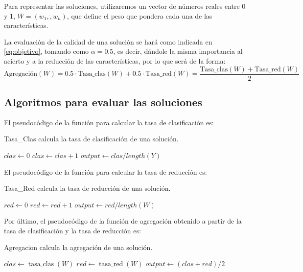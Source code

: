 \documentclass[11pt,a4paper]{article}
\begin{document}
Para representar las soluciones, utilizaremos un vector de números reales entre 0 y 1, $W = (w_{1}, \dot, w_{n})$, que define el peso que pondera cada una de las características.

La evaluación de la calidad de una solución se hará como indicada en \eqref{eq:objetivo}, tomando como $\alpha = 0.5$, es decir, dándole la misma importancia al acierto y a la reducción de las características, por lo que será de la forma:
$$\text{Agregación}(W) = 0.5 \cdot \text{Tasa\_clas}(W) + 0.5 \cdot \text{Tasa\_red}(W) = \frac{\text{Tasa\_clas}(W) + \text{Tasa\_red}(W)}{2}$$

\subsection{Algoritmos para evaluar las soluciones}

El pseudocódigo de la función para calcular la tasa de clasificación es: \\
\begin{algorithm}[H]
	\caption{{\sc Tasa\_Clas} calcula la tasa de clasificación de una solución.}
	
	$clas \gets 0$ \;
	 {
		 {
			$clas \gets clas + 1$ \;
		}
	}
	$output \gets clas / length(Y)$ \;
	 \;
\end{algorithm}

El pseudocódigo de la función para calcular la tasa de reducción es: \\
\begin{algorithm}[H]
	\caption{{\sc Tasa\_Red} calcula la tasa de reducción de una solución.}
	
	$red \gets 0$ \;
	 {
		 {
			$red \gets red + 1$ \;
		}
	}
	$output \gets red / length(W)$ \;
	 \;
\end{algorithm}

Por último, el pseudocódigo de la función de agregación obtenido a partir de la tasa de clasificación y la tasa de reducción es: \\
\begin{algorithm}[H]
	\caption{{\sc Agregacion} calcula la agregación de una solución.}
	
	$clas \gets \operatorname{tasa\_clas}(W)$ \;
	$red \gets \operatorname{tasa\_red}(W)$ \;
	$output \gets (clas + red)/2$ \;
	 \;
\end{algorithm}
\end{document}
